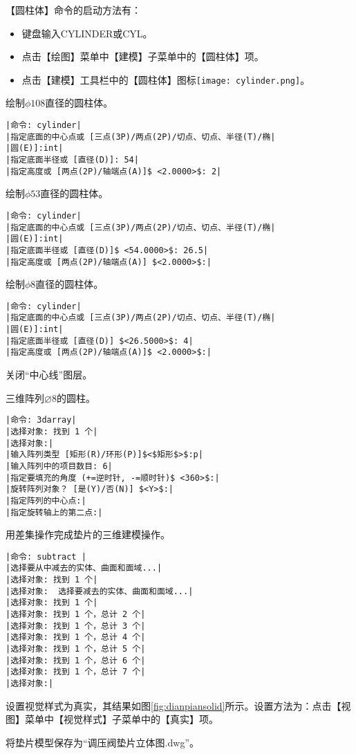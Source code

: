 \begin{procedure}
【圆柱体】命令的启动方法有：
\begin{itemize}
\item 键盘输入CYLINDER或CYL。
\item 点击【绘图】菜单中【建模】子菜单中的【圆柱体】项。
\item 点击【建模】工具栏中的【圆柱体】图标\texttt{[image: cylinder.png]}。
\end{itemize}
绘制$\phi 108$直径的圆柱体。
\begin{lstlisting}
|命令: cylinder|
|指定底面的中心点或 [三点(3P)/两点(2P)/切点、切点、半径(T)/椭|
|圆(E)]:int|
|指定底面半径或 [直径(D)]: 54|
|指定高度或 [两点(2P)/轴端点(A)]$ <2.0000>$: 2|
\end{lstlisting}
绘制$\phi 53$直径的圆柱体。
\begin{lstlisting}
|命令: cylinder|
|指定底面的中心点或 [三点(3P)/两点(2P)/切点、切点、半径(T)/椭|
|圆(E)]:int|
|指定底面半径或 [直径(D)]$ <54.0000>$: 26.5|
|指定高度或 [两点(2P)/轴端点(A)] $<2.0000>$:|
\end{lstlisting}
绘制$\phi 8$直径的圆柱体。
\begin{lstlisting}
|命令: cylinder|
|指定底面的中心点或 [三点(3P)/两点(2P)/切点、切点、半径(T)/椭|
|圆(E)]:int|
|指定底面半径或 [直径(D)] $<26.5000>$: 4|
|指定高度或 [两点(2P)/轴端点(A)]$ <2.0000>$:|
\end{lstlisting}
\item 关闭“中心线”图层。
\item 三维阵列$\diameter 8$的圆柱。
\begin{lstlisting}
|命令: 3darray|
|选择对象: 找到 1 个|
|选择对象:|
|输入阵列类型 [矩形(R)/环形(P)]$<$矩形$>$:p|
|输入阵列中的项目数目: 6|
|指定要填充的角度 (+=逆时针, -=顺时针)$ <360>$:|
|旋转阵列对象？ [是(Y)/否(N)] $<Y>$:|
|指定阵列的中心点:|
|指定旋转轴上的第二点:|
\end{lstlisting}
\item 用差集操作完成垫片的三维建模操作。
\begin{lstlisting}
|命令: subtract |
|选择要从中减去的实体、曲面和面域...|
|选择对象: 找到 1 个|
|选择对象:  选择要减去的实体、曲面和面域...|
|选择对象: 找到 1 个|
|选择对象: 找到 1 个，总计 2 个|
|选择对象: 找到 1 个，总计 3 个|
|选择对象: 找到 1 个，总计 4 个|
|选择对象: 找到 1 个，总计 5 个|
|选择对象: 找到 1 个，总计 6 个|
|选择对象: 找到 1 个，总计 7 个|
|选择对象:|
\end{lstlisting}
\item 设置视觉样式为真实，其结果如图\ref{fig:dianpiansolid}所示。设置方法为：点击【视图】菜单中【视觉样式】子菜单中的【真实】项。
\item 将垫片模型保存为“调压阀垫片立体图.dwg”。
\end{procedure}

\endinput